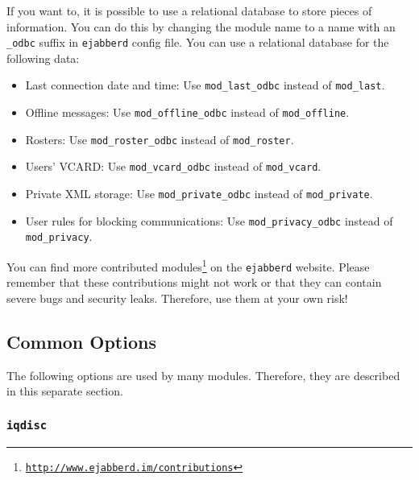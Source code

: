 \documentclass[a4paper,10pt]{book}
\newcommand{\ind}[1]{\begin{latexonly}\index{#1}\end{latexonly}}
\newcommand{\option}[1]{\texttt{#1}}
\newcommand{\term}[1]{\texttt{#1}}
\newcommand{\ejabberd}{\texttt{ejabberd}}
\gdef\footahref#1#2{#2\footnote{\href{#1}{\texttt{#1}}}}
\begin{document}
If you want to,
it is possible to use a relational database to store pieces of
information. You can do this by changing the module name to a name with an
\term{\_odbc} suffix in \ejabberd{} config file. You can use a relational
database for the following data:

\begin{itemize}
\item Last connection date and time: Use \term{mod\_last\_odbc} instead of
  \term{mod\_last}.
\item Offline messages: Use \term{mod\_offline\_odbc} instead of
  \term{mod\_offline}.
\item Rosters: Use \term{mod\_roster\_odbc} instead of \term{mod\_roster}.
\item Users' VCARD: Use \term{mod\_vcard\_odbc} instead of \term{mod\_vcard}.
\item Private XML storage: Use \term{mod\_private\_odbc} instead of \term{mod\_private}.
\item User rules for blocking communications: Use \term{mod\_privacy\_odbc} instead of \term{mod\_privacy}.
\end{itemize}

You can find more
\footahref{http://www.ejabberd.im/contributions}{contributed modules} on the
\ejabberd{} website. Please remember that these contributions might not work or
that they can contain severe bugs and security leaks. Therefore, use them at
your own risk!


\subsection{Common Options}
\label{modcommonoptions}

The following options are used by many modules. Therefore, they are described in
this separate section.

\subsubsection{\option{iqdisc}}
\label{modiqdiscoption}
\ind{options!iqdisc}
\end{document}
